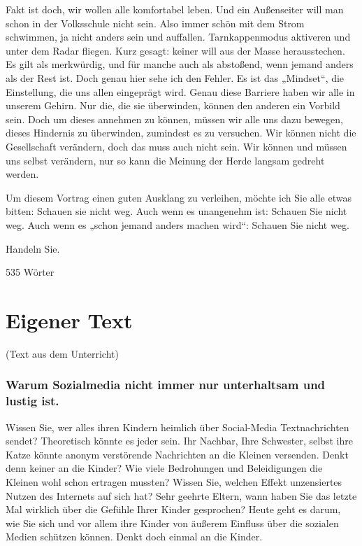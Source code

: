 Fakt ist doch, wir wollen alle komfortabel leben. Und ein Außenseiter will man schon in der Volksschule nicht sein. Also immer schön mit dem Strom schwimmen, ja nicht anders sein und auffallen. Tarnkappenmodus aktiveren und unter dem Radar fliegen. Kurz gesagt: keiner will aus der Masse herausstechen. Es gilt als merkwürdig, und für manche auch als abstoßend, wenn jemand anders als der Rest ist. Doch genau hier sehe ich den Fehler. Es ist das „Mindset“, die Einstellung, die uns allen eingeprägt wird. Genau diese Barriere haben wir alle in unserem Gehirn. Nur die, die sie überwinden, können den anderen ein Vorbild sein. Doch um dieses annehmen zu können, müssen wir alle uns dazu bewegen, dieses Hindernis zu überwinden, zumindest es zu versuchen. Wir können nicht die Gesellschaft verändern, doch das muss auch nicht sein. Wir können und müssen uns selbst verändern, nur so kann die Meinung der Herde langsam gedreht werden.  

Um diesem Vortrag einen guten Ausklang zu verleihen, möchte ich Sie alle etwas bitten: Schauen sie nicht weg.  
Auch wenn es unangenehm ist: Schauen Sie nicht weg.  
Auch wenn es „schon jemand anders machen wird“: Schauen Sie nicht weg.  

Handeln Sie. 

535 Wörter 

\section{Eigener Text}
(Text aus dem Unterricht)
\subsubsection{Warum Sozialmedia nicht immer nur unterhaltsam und lustig ist. }

Wissen Sie, wer alles ihren Kindern heimlich über Social-Media Textnachrichten sendet? Theoretisch könnte es jeder sein. Ihr Nachbar, Ihre Schwester, selbst ihre Katze könnte anonym verstörende Nachrichten an die Kleinen versenden. Denkt denn keiner an die Kinder? Wie viele Bedrohungen und Beleidigungen die Kleinen wohl schon ertragen mussten? Wissen Sie, welchen Effekt unzensiertes Nutzen des Internets auf sich hat? Sehr geehrte Eltern, wann haben Sie das letzte Mal wirklich über die Gefühle Ihrer Kinder gesprochen? Heute geht es darum, wie Sie sich und vor allem ihre Kinder von äußerem Einfluss über die sozialen Medien schützen können. Denkt doch einmal an die Kinder. 

 

